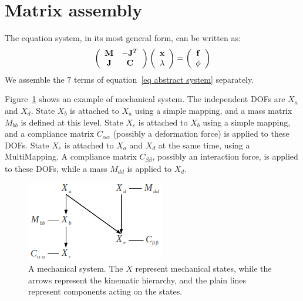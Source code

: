 \section{Matrix assembly} \label{sec matrix assembly}
The equation system, in its most general form, can be written as:
\begin{equation}
 \label{eq abstract system}
 \left( \begin{array}{cc}
\mathbf{M} & -\mathbf{J}^T \\
\mathbf{J} &  \mathbf{C} \end{array}\right)
\left( \begin{array}{c}
\mathbf{x} \\ \mathbf{\lambda}
\end{array}\right) = \left( \begin{array}{c}
\mathbf{f}  \\
\phi
\end{array}\right) 
\end{equation}
We assemble the $7$ terms of equation~\ref{eq abstract system} separately. 

Figure~\ref{fig system graph} shows an example of mechanical system.
The independent DOFs are $X_{a}$ and $X_d$.
State $X_b$ is attached to $X_a$ using a simple mapping, and a mass matrix $M_{bb}$ is defined at this level.
State $X_c$ is attached to $X_b$ using a simple mapping, and a compliance matrix $C_{\alpha \alpha}$ (possibly a deformation force) is applied to these DOFs.
State $X_e$ is attached to $X_a$ and  $X_d$ at the same time, using a MultiMapping. A compliance matrix $C_{\beta \beta}$, possibly an interaction force, is applied to these DOFs, 
while a mass $M_{dd}$ is applied to $X_d$.
\begin{figure}
\centering
 \includegraphics[width=0.49\linewidth]{system-graph.png}
\caption{A mechanical system. The $X$ represent mechanical states, while the arrows represent the kinematic hierarchy, and the plain lines represent components acting on the states.}
\label{fig system graph}
\end{figure}


